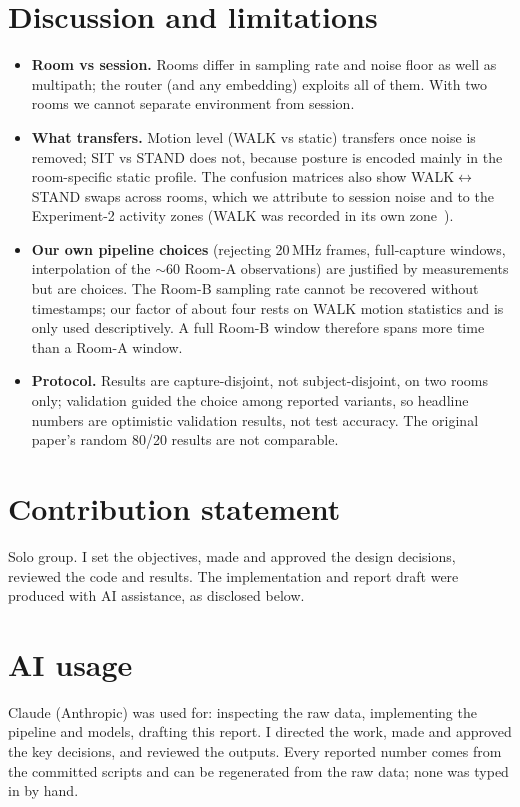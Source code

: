 \documentclass[11pt]{article}
\begin{document}
\section{Discussion and limitations}
\begin{itemize}
\item \textbf{Room vs session.} Rooms differ in sampling rate and noise floor as well as multipath; the
router (and any embedding) exploits all of them. With two rooms we cannot separate environment from session.
\item \textbf{What transfers.} Motion level (WALK vs static) transfers once noise is removed; SIT vs STAND
does not, because posture is encoded mainly in the room-specific static profile. The confusion matrices also
show WALK$\leftrightarrow$STAND swaps across rooms, which we attribute to session noise and to the
Experiment-2 activity zones (WALK was recorded in its own zone~\cite{schafer}).
\item \textbf{Our own pipeline choices} (rejecting 20\,MHz frames, full-capture windows, interpolation of
the $\sim$60 Room-A observations) are justified by measurements but are choices. The Room-B sampling rate
cannot be recovered without timestamps; our factor of about four rests on WALK motion statistics and is
only used descriptively. A full Room-B window therefore spans more time than a Room-A window.
\item \textbf{Protocol.} Results are capture-disjoint, not subject-disjoint, on two rooms only; validation
guided the choice among reported variants, so headline numbers are optimistic validation results, not test
accuracy. The original paper's random 80/20 results are not comparable.
\end{itemize}

\section*{Contribution statement}
Solo group. I set the objectives, made and approved the design decisions, reviewed the code and results. The implementation and report draft were produced with AI assistance, as disclosed below.

\section*{AI usage}
Claude (Anthropic) was used for: inspecting the raw data, implementing the
pipeline and models, drafting this report. I directed the work, made and
approved the key decisions, and reviewed the outputs. Every reported number comes from the committed
scripts and can be regenerated from the raw data; none was typed in by hand.
\end{document}
